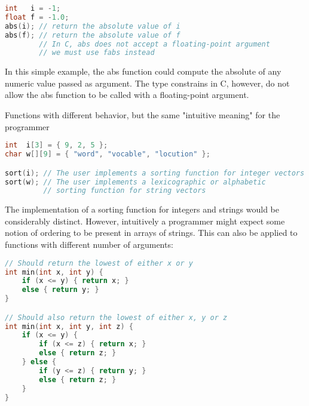 \documentclass[11pt]{article}
\begin{document}
\begin{lstlisting}[language=C]
int   i = -1;
float f = -1.0;
abs(i); // return the absolute value of i
abs(f); // return the absolute value of f
        // In C, abs does not accept a floating-point argument
        // we must use fabs instead
\end{lstlisting}

In this simple example, the abs function could compute the absolute of any numeric value passed as argument. The type constrains in C, however, do not allow the abs function to be called with a floating-point argument.

Functions with different behavior, but the same "intuitive meaning" for the programmer

\begin{lstlisting}[language=C]
int  i[3] = { 9, 2, 5 };
char w[][9] = { "word", "vocable", "locution" };

sort(i); // The user implements a sorting function for integer vectors
sort(w); // The user implements a lexicographic or alphabetic
         // sorting function for string vectors
\end{lstlisting}

The implementation of a sorting function for integers and strings would be considerably distinct. However, intuitively a programmer might expect some notion of ordering to be present in arrays of strings. This can also be applied to functions with different number of arguments:

\begin{lstlisting}[language=C]
// Should return the lowest of either x or y
int min(int x, int y) {
	if (x <= y) { return x; }
	else { return y; }
}

// Should also return the lowest of either x, y or z
int min(int x, int y, int z) {
	if (x <= y) {
		if (x <= z) { return x; }
		else { return z; }
	} else {
		if (y <= z) { return y; }
		else { return z; }
	}
}
\end{lstlisting}

\printbibliography
\end{document}
